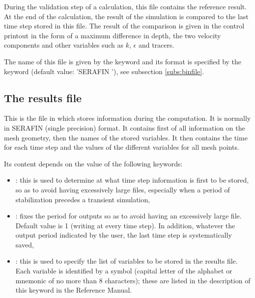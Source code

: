 During the validation step of a calculation, this file contains the reference
result.
At the end of the calculation, the result of the simulation is compared to the
last time step stored in this file. The result of the comparison is given in
the control printout in the form of a maximum difference in depth,
the two velocity components and other variables such as $k$, $\epsilon$ and
tracers.

The name of this file is given by the keyword  and its
format is specified by the keyword  (default
value: 'SERAFIN '), see subsection \ref{subs:binfile}.


\subsection{The results file}

This is the file in which  stores information during the computation.
It is normally in SERAFIN (single precision) format.
It contains first of all information on the mesh geometry,
then the names of the stored variables.
It then contains the time for each time step and the values of the different
variables for all mesh points.

Its content depends on the value of the following keywords:
\begin{itemize}
\item {}:
this is used to determine at what time step information is first to be stored,
so as to avoid having excessively large files, especially when a period of
stabilization precedes a transient simulation,

\item {}:
fixes the period for outputs so as to avoid having an excessively large file.
Default value is 1 (writing at every time step).
In addition, whatever the output period indicated by the user,
the last time step is systematically saved,

\item {}:
this is used to specify the list of variables to be stored in the results file.
Each variable is identified by a symbol (capital letter of the alphabet
or mnemonic of no more than 8 characters);
these are listed in the description of this keyword in the Reference Manual.


\end{itemize}

